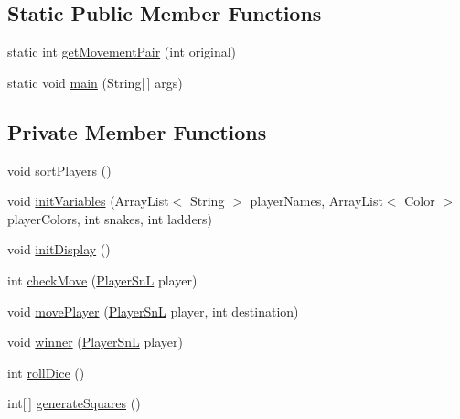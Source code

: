 \subsection*{Static Public Member Functions}
\begin{DoxyCompactItemize}
\item 
static int \hyperlink{class_game_1_1_game_sn_l_adb89cd5405a48486385f71e283923f4e}{get\+Movement\+Pair} (int original)
\item 
static void \hyperlink{class_game_1_1_game_sn_l_ab20ec2d01e628a96bbf74c98d2c471b1}{main} (String\mbox{[}$\,$\mbox{]} args)
\end{DoxyCompactItemize}
\subsection*{Private Member Functions}
\begin{DoxyCompactItemize}
\item 
void \hyperlink{class_game_1_1_game_sn_l_a9ea5d21ac9e477612c96de2ffa25fce3}{sort\+Players} ()
\item 
void \hyperlink{class_game_1_1_game_sn_l_a95f5e6f89379d65d08bf6421b07b202b}{init\+Variables} (Array\+List$<$ String $>$ player\+Names, Array\+List$<$ Color $>$ player\+Colors, int snakes, int ladders)
\item 
void \hyperlink{class_game_1_1_game_sn_l_ae3a0f31e079a3eb474a5e0a90ebf5a50}{init\+Display} ()
\item 
int \hyperlink{class_game_1_1_game_sn_l_a0b8ab49d329624503e5ca5dd85cb64c3}{check\+Move} (\hyperlink{class_player_1_1_player_sn_l}{Player\+Sn\+L} player)
\item 
void \hyperlink{class_game_1_1_game_sn_l_a9a88724dc4d30ef554e1024facc396ee}{move\+Player} (\hyperlink{class_player_1_1_player_sn_l}{Player\+Sn\+L} player, int destination)
\item 
void \hyperlink{class_game_1_1_game_sn_l_ad27ea3509697a5154650136b9b8a6ad6}{winner} (\hyperlink{class_player_1_1_player_sn_l}{Player\+Sn\+L} player)
\item 
int \hyperlink{class_game_1_1_game_sn_l_a2014a57bc83dedaff97c1dbc1a7ff558}{roll\+Dice} ()
\item 
int\mbox{[}$\,$\mbox{]} \hyperlink{class_game_1_1_game_sn_l_a7e7927cbebfd31c8bb0204edc40adffc}{generate\+Squares} ()
\end{DoxyCompactItemize}
